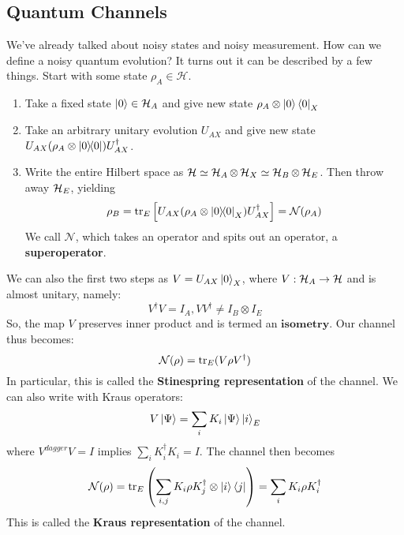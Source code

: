 \subsection{Quantum Channels}
We've already talked about noisy states and noisy measurement. How can we define a noisy quantum evolution? It turns out it can be described by a few things. Start with
some state $\rho_A \in \mathcal{H}$.
\begin{enumerate}
    \item Take a fixed state $\ket{0} \in \mathcal{H}_A$ and give new state $\rho_A \otimes \ket{0}\bra{0}_X$
    \item Take an arbitrary unitary evolution $U_{AX}$ and give new state $U_{AX}\qty(\rho_A \otimes \ketbra{0}) U_{AX}^{\dagger}$.
    \item Write the entire Hilbert space as $\operatorname{\mathcal{H}} \simeq \operatorname{\mathcal{H}}_A \otimes \operatorname{\mathcal{H}}_X \simeq \operatorname{\mathcal{H}}_B \otimes \operatorname{\mathcal{H}}_E$. Then throw away $\operatorname{\mathcal{H}}_E$, yielding
    \[ \rho_B = \tr_E\qty[U_{AX} (\rho_A \otimes \ketbra{0}_X) U_{AX}^{\dagger}] = \mathcal{N}(\rho_A) \]
    We call $\mathcal{N}$, which takes an operator and spits out an operator, a \textbf{superoperator}.
\end{enumerate}
We can also the first two steps as $V = U_{AX} \ket{0}_X$, where $V: \operatorname{\mathcal{H}}_A \to \operatorname{\mathcal{H}}$ and is almost unitary, namely:
\[ V^{\dagger} V = I_A, VV^{\dagger} \neq I_B \otimes I_E \]
So, the map $V$ preserves inner product and is termed an $\textbf{isometry}$. Our channel thus becomes:
\[ \mathcal{N}(\rho) = \tr_E(V \rho V^{\dagger}) \]
In particular, this is called the \textbf{Stinespring representation} of the channel. We can also write with Kraus operators:
\[ V \ket{\Psi}  = \sum_i K_i \ket{\Psi} \ket{i}_E \]
where $V^{dagger}V = I$ implies $\sum_i K_i^{\dagger} K_i = I$. The channel then becomes
\[ \mathcal{N}(\rho) = \tr_E\qty(\sum_{i, j} K_i \rho K_j^{\dagger} \otimes \ket{i}\bra{j}) = \sum_i K_i \rho K_i^{\dagger} \]
This is called the \textbf{Kraus representation} of the channel.

